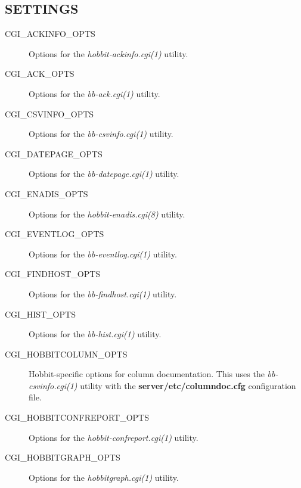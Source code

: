  
\subsection{SETTINGS}
\begin{description}
\item[CGI\_ACKINFO\_OPTS] Options for the \emph{hobbit-ackinfo.cgi(1)}
 utility. 

 

\item[CGI\_ACK\_OPTS] Options for the \emph{bb-ack.cgi(1)}
 utility. 

 

\item[CGI\_CSVINFO\_OPTS] Options for the \emph{bb-csvinfo.cgi(1)}
 utility. 

 

\item[CGI\_DATEPAGE\_OPTS] Options for the \emph{bb-datepage.cgi(1)}
 utility. 

 

\item[CGI\_ENADIS\_OPTS] Options for the \emph{hobbit-enadis.cgi(8)}
 utility. 

 

\item[CGI\_EVENTLOG\_OPTS] Options for the \emph{bb-eventlog.cgi(1)}
 utility. 

 

\item[CGI\_FINDHOST\_OPTS] Options for the \emph{bb-findhost.cgi(1)}
 utility. 

 

\item[CGI\_HIST\_OPTS] Options for the \emph{bb-hist.cgi(1)}
 utility. 

 

\item[CGI\_HOBBITCOLUMN\_OPTS] Hobbit-specific options for column documentation. This uses the \emph{bb-csvinfo.cgi(1)}
 utility with the \textbf{server/etc/columndoc.cfg}
 configuration file. 

 

\item[CGI\_HOBBITCONFREPORT\_OPTS] Options for the \emph{hobbit-confreport.cgi(1)}
 utility. 

 

\item[CGI\_HOBBITGRAPH\_OPTS] Options for the \emph{hobbitgraph.cgi(1)}
 utility. 

 


\end{description}
